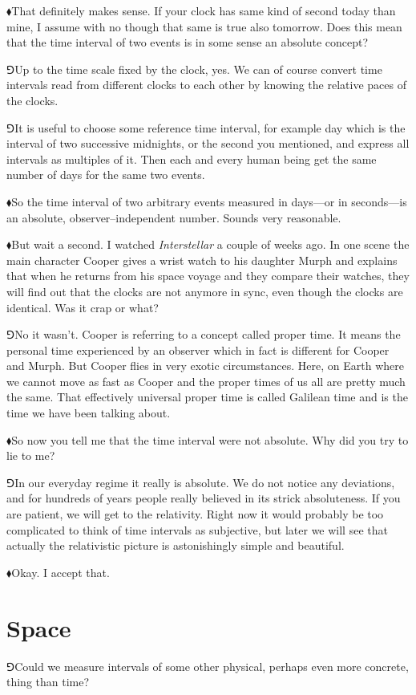 \documentclass[10pt,oneside%
]{memoir}
\newcommand{\hea}{\(\blacklozenge\)\;}
\newcommand{\heb}{\(\Game\)\;}
\begin{document}
\hea That definitely makes sense. If your clock has same kind of second today than mine, I assume with no though that same is true also tomorrow. Does this mean that the time interval of two events is in some sense an absolute concept?

\heb Up to the time scale fixed by the clock, yes. We can of course convert time intervals read from different clocks to each other by knowing the relative paces of the clocks.

\heb It is useful to choose some reference time interval, for example day which is the interval of two successive midnights, or the second you mentioned, and express all intervals as multiples of it. Then each and every human being get the same number of days for the same two events.

\hea So the time interval of two arbitrary events measured in days---or in seconds---is an absolute, observer--independent number. Sounds very reasonable.

\hea But wait a second. I watched \emph{Interstellar} a couple of weeks ago. In one scene the main character Cooper gives a wrist watch to his daughter Murph and explains that when he returns from his space voyage and they compare their watches, they will find out that the clocks are not anymore in sync, even though the clocks are identical. Was it crap or what?

\heb No it wasn't. Cooper is referring to a concept called proper time. It means the personal time experienced by an observer which in fact is different for Cooper and Murph. But Cooper flies in very exotic circumstances. Here, on Earth where we cannot move as fast as Cooper and the proper times of us all are pretty much the same. That effectively universal proper time is called Galilean time and is the time we have been talking about.

\hea So now you tell me that the time interval were not absolute. Why did you try to lie to me?

\heb In our everyday regime it really is absolute. We do not notice any deviations, and for hundreds of years people really believed in its strick absoluteness. If you are patient, we will get to the relativity. Right now it would probably be too complicated to think of time intervals as subjective, but later we will see that actually the relativistic picture is astonishingly simple and beautiful.

\hea Okay. I accept that.
\section{Space}
\heb Could we measure intervals of some other physical, perhaps even more concrete, thing than time?
\end{document}
